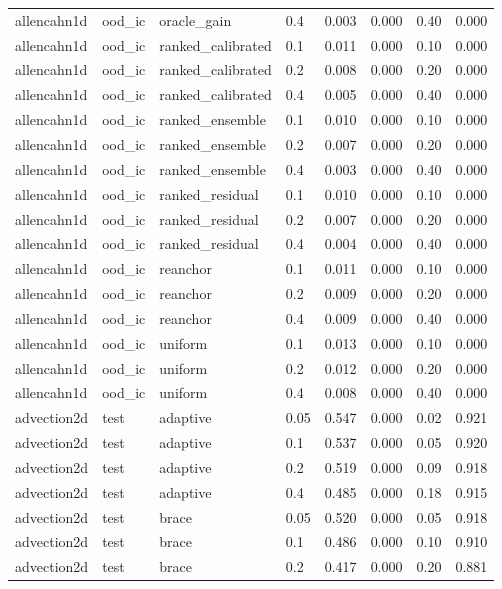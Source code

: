 \begin{tabular}{llllrrrr}
allencahn1d & ood\_ic & oracle\_gain & 0.4 & 0.003 & 0.000 & 0.40 & 0.000 \\
allencahn1d & ood\_ic & ranked\_calibrated & 0.1 & 0.011 & 0.000 & 0.10 & 0.000 \\
allencahn1d & ood\_ic & ranked\_calibrated & 0.2 & 0.008 & 0.000 & 0.20 & 0.000 \\
allencahn1d & ood\_ic & ranked\_calibrated & 0.4 & 0.005 & 0.000 & 0.40 & 0.000 \\
allencahn1d & ood\_ic & ranked\_ensemble & 0.1 & 0.010 & 0.000 & 0.10 & 0.000 \\
allencahn1d & ood\_ic & ranked\_ensemble & 0.2 & 0.007 & 0.000 & 0.20 & 0.000 \\
allencahn1d & ood\_ic & ranked\_ensemble & 0.4 & 0.003 & 0.000 & 0.40 & 0.000 \\
allencahn1d & ood\_ic & ranked\_residual & 0.1 & 0.010 & 0.000 & 0.10 & 0.000 \\
allencahn1d & ood\_ic & ranked\_residual & 0.2 & 0.007 & 0.000 & 0.20 & 0.000 \\
allencahn1d & ood\_ic & ranked\_residual & 0.4 & 0.004 & 0.000 & 0.40 & 0.000 \\
allencahn1d & ood\_ic & reanchor & 0.1 & 0.011 & 0.000 & 0.10 & 0.000 \\
allencahn1d & ood\_ic & reanchor & 0.2 & 0.009 & 0.000 & 0.20 & 0.000 \\
allencahn1d & ood\_ic & reanchor & 0.4 & 0.009 & 0.000 & 0.40 & 0.000 \\
allencahn1d & ood\_ic & uniform & 0.1 & 0.013 & 0.000 & 0.10 & 0.000 \\
allencahn1d & ood\_ic & uniform & 0.2 & 0.012 & 0.000 & 0.20 & 0.000 \\
allencahn1d & ood\_ic & uniform & 0.4 & 0.008 & 0.000 & 0.40 & 0.000 \\
\midrule
advection2d & test & adaptive & 0.05 & 0.547 & 0.000 & 0.02 & 0.921 \\
advection2d & test & adaptive & 0.1 & 0.537 & 0.000 & 0.05 & 0.920 \\
advection2d & test & adaptive & 0.2 & 0.519 & 0.000 & 0.09 & 0.918 \\
advection2d & test & adaptive & 0.4 & 0.485 & 0.000 & 0.18 & 0.915 \\
advection2d & test & brace & 0.05 & 0.520 & 0.000 & 0.05 & 0.918 \\
advection2d & test & brace & 0.1 & 0.486 & 0.000 & 0.10 & 0.910 \\
advection2d & test & brace & 0.2 & 0.417 & 0.000 & 0.20 & 0.881 \\

\end{tabular}
